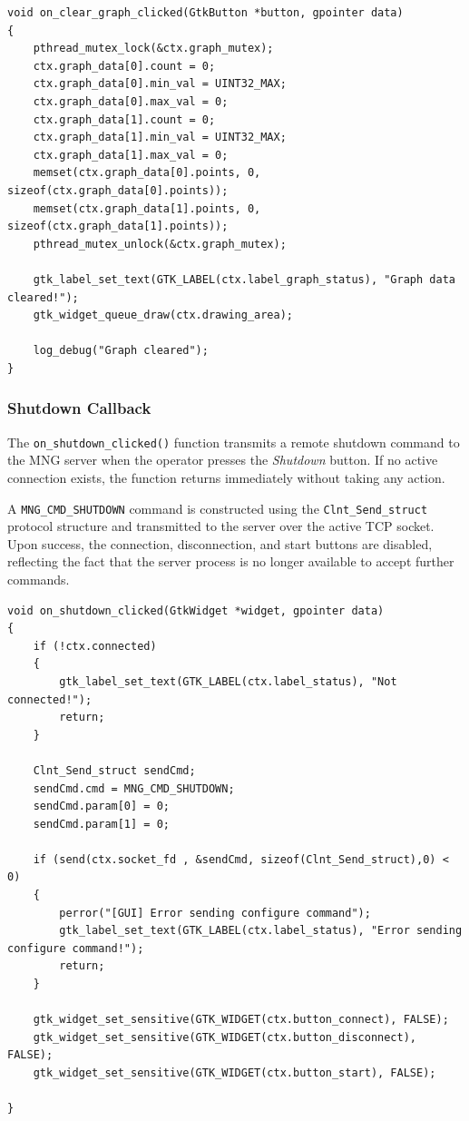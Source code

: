 \begin{verbatim}
void on_clear_graph_clicked(GtkButton *button, gpointer data)
{
    pthread_mutex_lock(&ctx.graph_mutex);
    ctx.graph_data[0].count = 0;
    ctx.graph_data[0].min_val = UINT32_MAX;
    ctx.graph_data[0].max_val = 0;
    ctx.graph_data[1].count = 0;
    ctx.graph_data[1].min_val = UINT32_MAX;
    ctx.graph_data[1].max_val = 0;
    memset(ctx.graph_data[0].points, 0, sizeof(ctx.graph_data[0].points));
    memset(ctx.graph_data[1].points, 0, sizeof(ctx.graph_data[1].points));
    pthread_mutex_unlock(&ctx.graph_mutex);

    gtk_label_set_text(GTK_LABEL(ctx.label_graph_status), "Graph data cleared!");
    gtk_widget_queue_draw(ctx.drawing_area);

    log_debug("Graph cleared");
}
\end{verbatim}


\subsubsection{Shutdown Callback}

The \texttt{on\_shutdown\_clicked()} function transmits a remote shutdown
command to the MNG server when the operator presses the \textit{Shutdown}
button. If no active connection exists, the function returns immediately
without taking any action.

A \texttt{MNG\_CMD\_SHUTDOWN} command is constructed using the
\texttt{Clnt\_Send\_struct} protocol structure and transmitted to the
server over the active TCP socket. Upon success, the connection,
disconnection, and start buttons are disabled, reflecting the fact that
the server process is no longer available to accept further commands.


\begin{verbatim}
void on_shutdown_clicked(GtkWidget *widget, gpointer data)
{
    if (!ctx.connected)
    {
        gtk_label_set_text(GTK_LABEL(ctx.label_status), "Not connected!");
        return;
    }

    Clnt_Send_struct sendCmd;
    sendCmd.cmd = MNG_CMD_SHUTDOWN;
    sendCmd.param[0] = 0;
    sendCmd.param[1] = 0;

    if (send(ctx.socket_fd , &sendCmd, sizeof(Clnt_Send_struct),0) < 0)
    {
        perror("[GUI] Error sending configure command");
        gtk_label_set_text(GTK_LABEL(ctx.label_status), "Error sending configure command!");
        return;
    }

    gtk_widget_set_sensitive(GTK_WIDGET(ctx.button_connect), FALSE);
    gtk_widget_set_sensitive(GTK_WIDGET(ctx.button_disconnect), FALSE);
    gtk_widget_set_sensitive(GTK_WIDGET(ctx.button_start), FALSE);

}
\end{verbatim}


